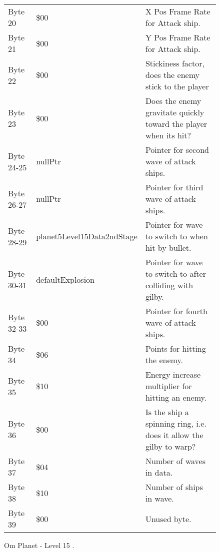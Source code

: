 \begin{figure}[H]
{\begin{adjustbox}{width=12cm}
\begin{tabular}{lll}
 Byte 20    & \$00                        & X Pos Frame Rate for Attack ship.                                   \\
 Byte 21    & \$00                        & Y Pos Frame Rate for Attack ship.                                   \\
 Byte 22    & \$00                        & Stickiness factor, does the enemy stick to the player               \\
 Byte 23    & \$00                        & Does the enemy gravitate quickly toward the player when its hit?    \\
 Byte 24-25 & nullPtr                    & Pointer for second wave of attack ships.                            \\
 Byte 26-27 & nullPtr                    & Pointer for third wave of attack ships.                             \\
 Byte 28-29 & planet5Level15Data2ndStage & Pointer for wave to switch to when hit by bullet.                   \\
 Byte 30-31 & defaultExplosion           & Pointer for  wave to switch to after colliding with gilby.          \\
 Byte 32-33 & \$00                        & Pointer for fourth wave of attack ships.                            \\
 Byte 34    & \$06                        & Points for hitting the enemy.                                       \\
 Byte 35    & \$10                        & Energy increase multiplier for hitting an enemy.                    \\
 Byte 36    & \$00                        & Is the ship a spinning ring, i.e. does it allow the gilby to warp?  \\
 Byte 37    & \$04                        & Number of waves in data.                                            \\
 Byte 38    & \$10                        & Number of ships in wave.                                            \\
 Byte 39    & \$00                        & Unused byte.                                                        \\
\bottomrule
\end{tabular}

  \end{adjustbox}

  }\caption*{Om Planet - Level 15
.}
\end{figure}


